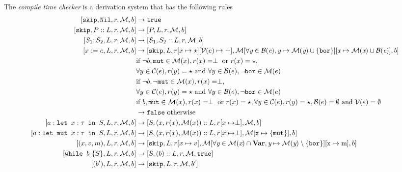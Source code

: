 \begin{definition}
\label{compiletimecheckerwhile}
The \emph{compile time checker} is a derivation system that has the following rules
\begin{align*}
\ccwhile{\texttt{skip}}{\texttt{Nil}}{r}{M}{b} & \to \texttt{true}  \\
\ccwhile{\texttt{skip}}{P::L}{r}{M}{b}      & \to \ccwhile{P}{L}{r}{M}{b}  \\
\ccwhile{S_1; S_2}{L}{r}{M}{b}                 & \to \ccwhile{S_1}{S_2::L}{r}{M}{b}  \\
\ccwhile{x:=e}{L}{r}{M}{b}                    & \to \ccwhile{\texttt{skip}}{L}{r[x\mapsto \star][\mathcal{V}(e) \mapsto -]}{M[\forall \textit{y} \in B(\textit{e}), \textit{y}\mapsto M(\textit{y})\cup \{\texttt{bor} \} ][\textit{x} \mapsto M(\textit{x}) \cup B(\textit{e})]}{b} \\
                                    & \textrm{if } \neg b, \texttt{mut} \in \mathcal{M}(x), r(x) = \perp \textrm{ or } r(x) = \star, \\ &  \forall y \in \mathcal{C}(e), r(y) = \star \textrm{ and } \forall y \in \mathcal{B}(e), \neg \texttt{bor} \in \mathcal{M}(e) \\
                                    & \textrm{if } \neg b, \neg \texttt{mut} \in \mathcal{M}(x),  r(x) = \perp,  \\ & \forall y \in \mathcal{C}(e), r(y) = \star \textrm{ and } \forall y \in \mathcal{B}(e), \neg \texttt{bor} \in \mathcal{M}(e) \\
                                    & \textrm{if } b, \texttt{mut} \in \mathcal{M}(x), r(x) = \perp \textrm{ or } r(x) = \star, \forall y \in \mathcal{C}(e), r(y) = \star, \mathcal{B}(e) = \emptyset \textrm{ and } \mathcal{V}(e) = \emptyset \\
                                    & \to \texttt{false} \textrm{ otherwise}\\
\ccwhile{\letm{x}{S}}{L}{r}{M}{b} & \to \ccwhile{S}{(x,r(x),\mathcal{M}(x))::L}{r[x\mapsto \perp]}{M}{b} \\
\ccwhile{\letmut{x}{S}}{L}{r}{M}{b} & \to \ccwhile{S}{(x,r(x),\mathcal{M}(x))::L}{r[x\mapsto \perp]}{M[\texttt{x}\mapsto\{\texttt{mut}\}]}{b} \\
\ccwhile{(x,v,m)}{L}{r}{M}{b}                    & \to \ccwhile{\texttt{skip}}{L}{r[x \mapsto v]}{M[\forall \textit{y} \in M(\textit{x})\cap\textbf{Var}, \textit{y} \mapsto M(\textit{y}) \setminus \{\texttt{bor}\}][\texttt{x} \mapsto \textrm{m}]}{b} \\

\ccwhile{\whi{S}}{L}{r}{M}{b} & \to \ccwhile{S}{(b)::L}{r}{M}{\texttt{true}} \\
\ccwhile{(b')}{L}{r}{M}{b} & \to \ccwhile{\texttt{skip}}{L}{r}{M}{b'}
\end{align*}
\end{definition}

